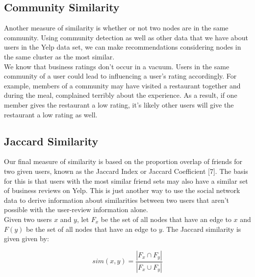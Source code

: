 \documentclass[10pt]{article}
\begin{document}
\subsection{Community Similarity}

Another measure of similarity is whether or not two nodes are in the same community. Using community detection as well as other data that we have about users in the Yelp data set, we can make recommendations considering nodes in the same cluster as the most similar. \\

We know that business ratings don't occur in a vacuum. Users in the same community of a user could lead to influencing a user's rating accordingly. For example, members of a community may have visited a restaurant together and during the meal, complained terribly about the experience. As a result, if one member gives the restaurant a low rating, it's likely other users will give the restaurant a low rating as well. \\



\subsection{Jaccard Similarity}

Our final measure of similarity is based on the proportion overlap of friends for two given users, known as the Jaccard Index or Jaccard Coefficient [7]. The basis for this is that users with the most similar friend sets may also have a similar set of business reviews on Yelp. This is just another way to use the social network data to derive information about similarities between two users that aren't possible with the user-review information alone. \\

Given two users $x$ and $y$, let $F_{x}$ be the set of all nodes that have an edge to $x$ and $F(y)$ be the set of all nodes that have an edge to $y$. The Jaccard similarity is given given by:

$$ sim(x, y) = \frac{|F_{x} \cap F_{y}|} {|F_{x} \cup F_{y}|} $$
\end{document}
